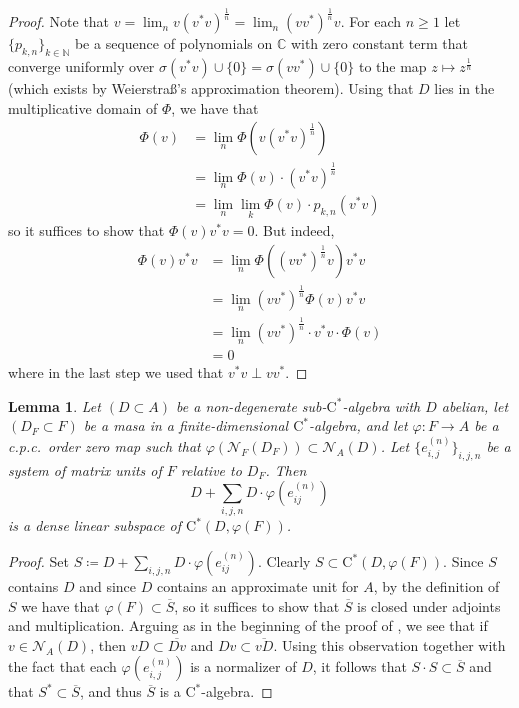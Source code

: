\documentclass[11pt,a4paper]{amsart}
\newtheorem{lemma}[theorem]{Lemma}
\theoremstyle{definition}
\numberwithin{equation}{section}
\newcommand{\mc}[1]{\mathcal{#1}}
\newcommand{\bb}[1]{\mathbb{#1}}
\begin{document}
\begin{proof}
Note that $v=\lim_nv(v^*v)^\frac{1}{n}=\lim_n (vv^*)^\frac{1}{n}v$. For each $n\ge1$ let $\{p_{k,n}\}_{k\in\bb{N}}$ be a sequence of polynomials on $\bb{C}$ with zero constant term that converge uniformly over $\sigma(v^*v)\cup\{0\}=\sigma(vv^*)\cup\{0\}$ to the map $z\mapsto z^\frac{1}{n}$ (which exists by Weierstra\ss 's approximation theorem). Using that $D$ lies in the multiplicative domain of $\Phi$, we have that
\begin{align*}
\Phi(v)&=\lim_n\Phi(v(v^*v)^\frac{1}{n})\\
&=\lim_n\Phi(v)\cdot (v^*v)^\frac{1}{n}\\
&=\lim_n\lim_k\Phi(v)\cdot p_{k,n}(v^*v)
\end{align*}
so it suffices to show that $\Phi(v)v^*v=0$. But indeed,
\begin{align*}
\Phi(v)v^*v&=\lim_n\Phi((vv^*)^\frac{1}{n}v)v^*v\\
&=\lim_n(vv^*)^\frac{1}{n}\Phi(v)v^*v\\
&=\lim_n(vv^*)^\frac{1}{n}\cdot v^*v\cdot \Phi(v)\\
&=0
\end{align*}
where in the last step we used that $v^*v\perp vv^*$.
\end{proof}

\begin{lemma}\label{lem:dense-subspace}
Let $(D\subset A)$ be a non-degenerate sub-$\mathrm{C}^\ast$-algebra with $D$ abelian, let $(D_F\subset F)$ be a masa in a finite-dimensional $\mathrm{C}^\ast$-algebra, and let $\varphi\colon F\to A$ be a c.p.c.\ order zero map such that $\varphi(\mc{N}_F(D_F))\subset\mc{N}_A(D)$. Let $\{e_{i,j}^{(n)}\}_{i,j,n}$ be a system of matrix units of $F$ relative to $D_F$. Then
\[
D+\sum_{i,j,n}D\cdot \varphi(e_{ij}^{(n)})
\]
is a dense linear subspace of $\mathrm{C}^\ast(D,\varphi(F))$.
\end{lemma}

\begin{proof}
Set $S\coloneqq D+\sum_{i,j,n}D\cdot \varphi(e_{ij}^{(n)})$. Clearly $S\subset \mathrm{C}^\ast(D,\varphi(F))$. Since $S$ contains $D$ and since $D$ contains an approximate unit for $A$, by the definition of $S$ we have that $\varphi(F)\subset \overline{S}$, so it suffices to show that $\overline{S}$ is closed under adjoints and multiplication. Arguing as in the beginning of the proof of , we see that if $v\in\mc{N}_A(D)$, then $vD\subset\overline{Dv}$ and $Dv\subset\overline{vD}$. Using this observation together with the fact that each $\varphi(e_{i,j}^{(n)})$ is a normalizer of $D$, it follows that $S\cdot S\subset \overline{S}$ and that $S^*\subset\overline{S}$, and thus $\overline{S}$ is a $\mathrm{C}^\ast$-algebra.
\end{proof}
\end{document}
